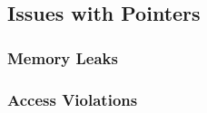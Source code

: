 \clearpage
\subsection{Issues with Pointers} %
\label{sub:issues_with_pointers}

\subsubsection{Memory Leaks} %
\label{ssub:memory_leaks}


\subsubsection{Access Violations} %
\label{ssub:access_violations}




